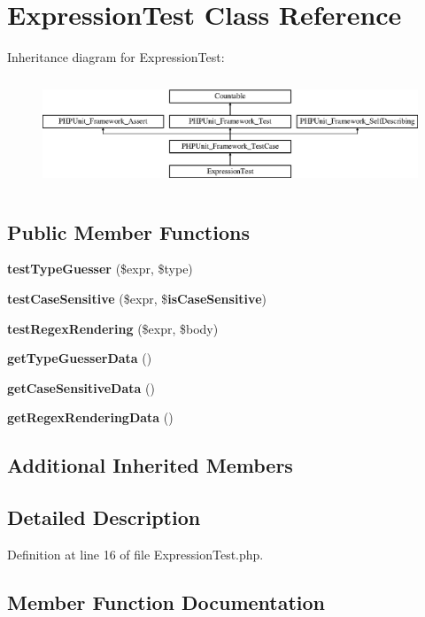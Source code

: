 \section{Expression\+Test Class Reference}
\label{class_symfony_1_1_component_1_1_finder_1_1_tests_1_1_expression_1_1_expression_test}
Inheritance diagram for Expression\+Test\+:\begin{figure}[H]
\begin{center}
\leavevmode
\includegraphics[height=3.303835cm]{class_symfony_1_1_component_1_1_finder_1_1_tests_1_1_expression_1_1_expression_test}
\end{center}
\end{figure}
\subsection*{Public Member Functions}
\begin{DoxyCompactItemize}
\item 
{\bf test\+Type\+Guesser} (\$expr, \$type)
\item 
{\bf test\+Case\+Sensitive} (\$expr, \${\bf is\+Case\+Sensitive})
\item 
{\bf test\+Regex\+Rendering} (\$expr, \$body)
\item 
{\bf get\+Type\+Guesser\+Data} ()
\item 
{\bf get\+Case\+Sensitive\+Data} ()
\item 
{\bf get\+Regex\+Rendering\+Data} ()
\end{DoxyCompactItemize}
\subsection*{Additional Inherited Members}


\subsection{Detailed Description}


Definition at line 16 of file Expression\+Test.\+php.



\subsection{Member Function Documentation}
